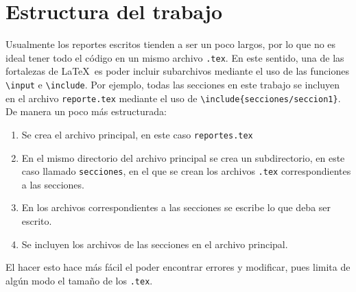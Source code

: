 \section{Estructura del trabajo}

\noindent Usualmente los reportes escritos tienden a ser un poco largos, por lo que no es ideal tener todo el código en un mismo archivo \texttt{.tex}. En este sentido, una de las fortalezas de \LaTeX~es poder incluir subarchivos mediante el uso de las funciones \texttt{\textbackslash{}input} e \texttt{\textbackslash{}include}. Por ejemplo, todas las secciones en este trabajo se incluyen en el archivo \texttt{reporte.tex} mediante el uso de \texttt{\textbackslash{}include\{secciones/seccion1\}}. De manera un poco más estructurada:
\begin{enumerate}
    \item Se crea el archivo principal, en este caso \texttt{reportes.tex}
    \item En el mismo directorio del archivo principal se crea un subdirectorio, en este caso llamado \texttt{secciones}, en el que se crean los archivos \texttt{.tex} correspondientes a las secciones.
    \item En los archivos correspondientes a las secciones se escribe lo que deba ser escrito.
    \item Se incluyen los archivos de las secciones en el archivo principal.
\end{enumerate}
El hacer esto hace más fácil el poder encontrar errores y modificar, pues limita de algún modo el tamaño de los \texttt{.tex}.